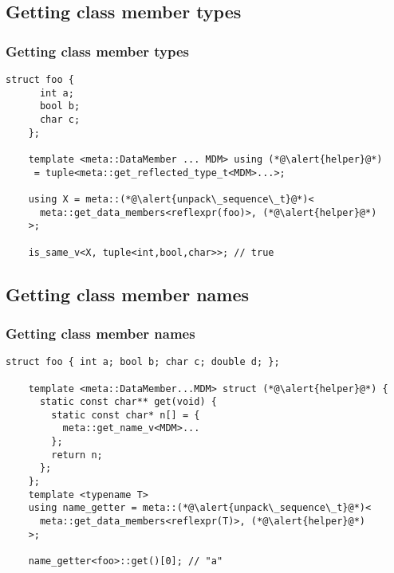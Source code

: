 \documentclass[compress,table,xcolor=table]{beamer}
\begin{document}
\subsection{Getting class member types}
\begin{frame}[fragile]
\frametitle{Getting class member types}
\begin{lstlisting}[basicstyle=\small\ttfamily]
	struct foo {
	  int a;
	  bool b;
	  char c;
	};

	template <meta::DataMember ... MDM> using (*@\alert{helper}@*)
	 = tuple<meta::get_reflected_type_t<MDM>...>;

	using X = meta::(*@\alert{unpack\_sequence\_t}@*)<
	  meta::get_data_members<reflexpr(foo)>, (*@\alert{helper}@*)
	>;

	is_same_v<X, tuple<int,bool,char>>; // true
\end{lstlisting}
\end{frame}

\subsection{Getting class member names}
\begin{frame}[fragile]
\frametitle{Getting class member names}
\begin{lstlisting}[basicstyle=\small\ttfamily]
	struct foo { int a; bool b; char c; double d; };

	template <meta::DataMember...MDM> struct (*@\alert{helper}@*) {
	  static const char** get(void) {
	    static const char* n[] = {
	      meta::get_name_v<MDM>...
	    };
	    return n;
	  };
	};
	template <typename T>
	using name_getter = meta::(*@\alert{unpack\_sequence\_t}@*)<
	  meta::get_data_members<reflexpr(T)>, (*@\alert{helper}@*)
	>;

	name_getter<foo>::get()[0]; // "a"
\end{lstlisting}
\end{frame}


\end{document}

